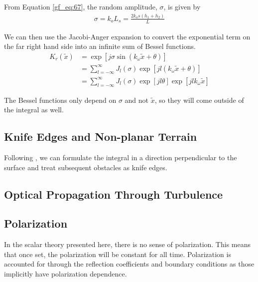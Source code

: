 \noindent From Equation \ref{gf_eq:67}, the random amplitude, $\sigma$, is given by
\begin{equation}
\begin{aligned}
\sigma = k_oL_s = \frac{2k_os(h_1+h_2)}{L}
\end{aligned}
\label{gf_eq:69}
\end{equation}
\renewcommand{\baselinestretch}{2} \small\normalsize

We can then use the Jacobi-Anger expansion \cite{gbur_math} to convert the exponential term on the far right hand side into an infinite sum of Bessel functions.
\begin{equation}
\begin{aligned}
K_r(\tilde{x}) &=\exp\left[j\sigma \sin\left(k_{\omega} \tilde{x} + \theta\right) \right] \\ &=\sum_{l=-\infty}^{\infty}J_l(\sigma)\exp\left[jl(k_{\omega}\tilde{x} + \theta) \right] \\
&=\sum_{l=-\infty}^{\infty}J_l(\sigma)\exp\left[jl\theta\right]\exp\left[jlk_{\omega}\tilde{x}\right] 
\end{aligned}
\label{gf_eq:70}
\end{equation}
\renewcommand{\baselinestretch}{2} \small\normalsize

The Bessel functions only depend on $\sigma$ and not $\tilde{x}$, so they will come outside of the integral as well.

\subsection {Knife Edges and Non-planar Terrain}
Following \cite{whitteker_diffraction}, we can formulate the integral in a direction perpendicular to the surface and treat subsequent obstacles as knife edges.

\subsection {Optical Propagation Through Turbulence}

\subsection{Polarization}
In the scalar theory presented here, there is no sense of polarization. This means that once set, the polarization will be constant for all time. Polarization is accounted for through the reflection coefficients and boundary conditions as those implicitly have polarization dependence.
